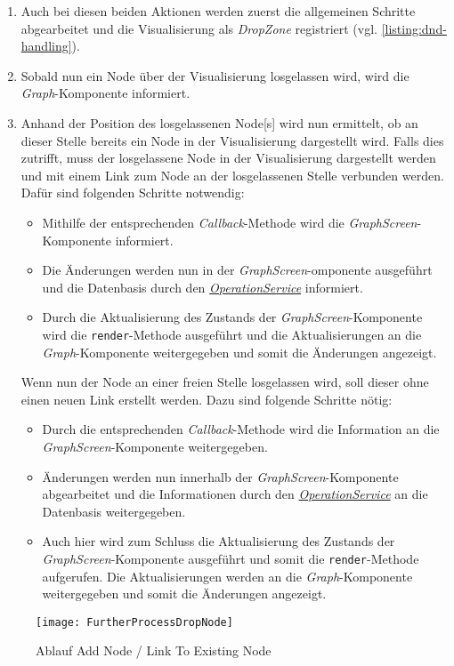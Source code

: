 \begin{enumerate}
    \item Auch bei diesen beiden Aktionen werden zuerst die allgemeinen Schritte abgearbeitet und die Visualisierung als \textit{DropZone} registriert (vgl. \autoref{listing:dnd-handling}).  
    \item Sobald nun ein \gls{Node} über der Visualisierung losgelassen wird, wird die \textit{Graph}-Komponente informiert. 
    \item Anhand der Position des losgelassenen \gls{Node}[s] wird nun ermittelt, ob an dieser Stelle bereits ein \gls{Node} in der Visualisierung dargestellt wird. Falls dies zutrifft, muss der losgelassene \gls{Node} in der Visualisierung dargestellt werden und mit einem \gls{Link} zum \gls{Node} an der losgelassenen Stelle verbunden werden. Dafür sind folgenden Schritte notwendig:
        \begin{itemize}
            \item Mithilfe der entsprechenden \textit{Callback}-Methode wird die \textit{GraphScreen}-Komponente informiert.
            \item Die Änderungen werden nun in der \textit{GraphScreen}-om\-po\-nen\-te ausgeführt und die Datenbasis durch den \hyperref[OperationService]{\textit{OperationService}} informiert.
            \item Durch die Aktualisierung des Zustands der \textit{GraphScreen}-Komponente wird die \texttt{render}-Methode ausgeführt und die Aktualisierungen an die \textit{Graph}-Komponente weitergegeben und somit die Änderungen angezeigt.    
        \end{itemize}
    Wenn nun der \gls{Node} an einer freien Stelle losgelassen wird, soll dieser ohne einen neuen \gls{Link} erstellt werden. Dazu sind folgende Schritte nötig:
        \begin{itemize}
            \item Durch die entsprechenden \textit{Callback}-Methode wird die Information an die \textit{GraphScreen}-Komponente weitergegeben.
            \item Änderungen werden nun innerhalb der \textit{GraphScreen}-Kom\-po\-nen\-te abgearbeitet und die Informationen durch den \hyperref[OperationService]{\textit{OperationService}} an die Datenbasis weitergegeben.
            \item Auch hier wird zum Schluss die Aktualisierung des Zustands der \textit{GraphScreen}-Komponente ausgeführt und somit die \texttt{render}-Methode aufgerufen. Die Aktualisierungen werden an die \textit{Graph}-Komponente weitergegeben und somit die Änderungen angezeigt.    
        \end{itemize}
\end{enumerate}
\begin{figure}[htbp]
\centerline{\texttt{[image: FurtherProcessDropNode]}}
\caption{Ablauf Add Node / Link To Existing Node}
\label{fig:sequence-afterdrop}
\end{figure}



